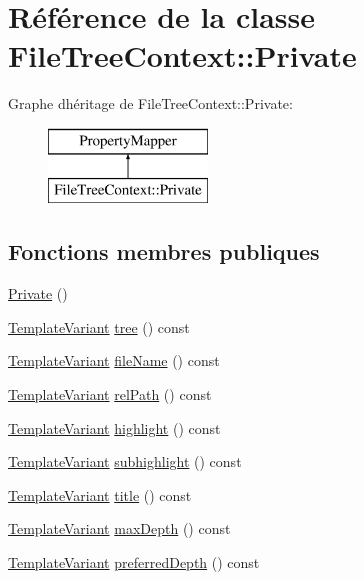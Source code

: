 \hypertarget{class_file_tree_context_1_1_private}{}\section{Référence de la classe File\+Tree\+Context\+:\+:Private}
\label{class_file_tree_context_1_1_private}
Graphe d\textquotesingle{}héritage de File\+Tree\+Context\+:\+:Private\+:\begin{figure}[H]
\begin{center}
\leavevmode
\includegraphics[height=2.000000cm]{class_file_tree_context_1_1_private}
\end{center}
\end{figure}
\subsection*{Fonctions membres publiques}
\begin{DoxyCompactItemize}
\item 
\hyperlink{class_file_tree_context_1_1_private_acf2c241d8fa1202b646dd37888123067}{Private} ()
\item 
\hyperlink{class_template_variant}{Template\+Variant} \hyperlink{class_file_tree_context_1_1_private_aaff272ee221917ab5da6e492da91e200}{tree} () const 
\item 
\hyperlink{class_template_variant}{Template\+Variant} \hyperlink{class_file_tree_context_1_1_private_a1f21659d04a0ae92664c1584d1cf748e}{file\+Name} () const 
\item 
\hyperlink{class_template_variant}{Template\+Variant} \hyperlink{class_file_tree_context_1_1_private_a4cea6838c2a68eed08189aeafc46856c}{rel\+Path} () const 
\item 
\hyperlink{class_template_variant}{Template\+Variant} \hyperlink{class_file_tree_context_1_1_private_a84f86a65a4879cdc615c76d3784cb1a0}{highlight} () const 
\item 
\hyperlink{class_template_variant}{Template\+Variant} \hyperlink{class_file_tree_context_1_1_private_a0c8171d189f6ecd3dc6b9908c302adb1}{subhighlight} () const 
\item 
\hyperlink{class_template_variant}{Template\+Variant} \hyperlink{class_file_tree_context_1_1_private_a012662e3b605a4f180df05c2bcc55047}{title} () const 
\item 
\hyperlink{class_template_variant}{Template\+Variant} \hyperlink{class_file_tree_context_1_1_private_a991e976545b825976df7ebf7e76814c1}{max\+Depth} () const 
\item 
\hyperlink{class_template_variant}{Template\+Variant} \hyperlink{class_file_tree_context_1_1_private_aaf9eed7b05fd64dbdb67674601ea9ba1}{preferred\+Depth} () const 
\end{DoxyCompactItemize}


